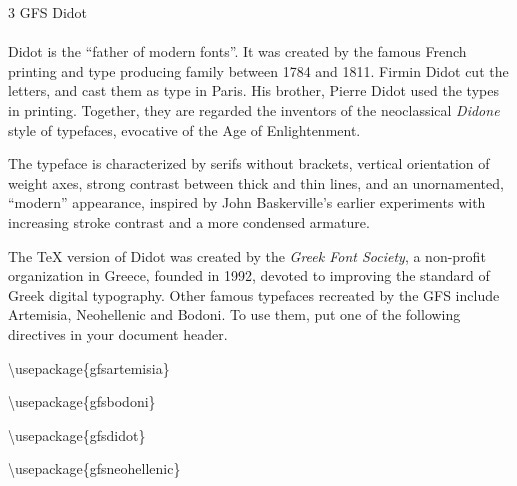 \documentclass{article}
\begin{document}
\frenchspacing

\noindent
{\LARGE 3 GFS Didot}\\
~\\
Didot is the ``father of modern fonts''. It was created by the famous French
printing and type producing family between 1784 and 1811.  Firmin Didot cut
the letters, and cast them as type in Paris.  His brother, Pierre Didot used
the types in printing.  Together, they are regarded the inventors of the
neoclassical \emph{Didone} style of typefaces, evocative of the Age of
Enlightenment.

The typeface is characterized by serifs without brackets, vertical
orientation of weight axes, strong contrast between thick and thin lines,
and an unornamented, ``modern'' appearance, inspired by John
Baskerville's earlier experiments with increasing stroke contrast and a more
condensed armature.

The \TeX{} version of Didot was created by the \emph{Greek Font Society}, a
non-profit organization in Greece, founded in 1992, devoted to improving the
standard of Greek digital typography.  Other famous typefaces recreated by
the GFS include Artemisia, Neohellenic and Bodoni.  To use them, put one of
the following directives in your document header.

\textbackslash usepackage\{gfsartemisia\}

\textbackslash usepackage\{gfsbodoni\}

\textbackslash usepackage\{gfsdidot\}

\textbackslash usepackage\{gfsneohellenic\}
\end{document}
